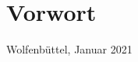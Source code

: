 \cleardoubleemptypage

\thispagestyle{empty}

\section*{Vorwort}
\label{sec:Vorwort}


\begin{flushright}
	Wolfenbüttel, Januar 2021
\end{flushright}



\cleardoubleemptypage
